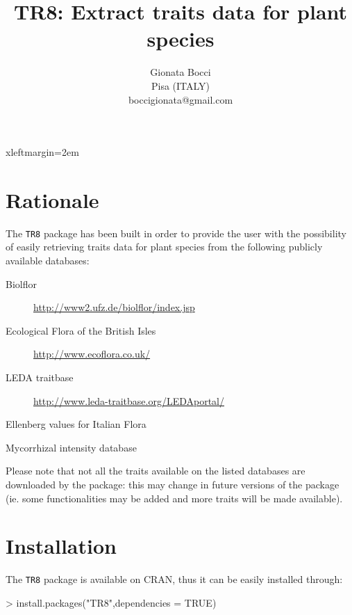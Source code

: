 \documentclass{article}
\title{TR8: Extract traits data for plant species}
\author{Gionata Bocci\\Pisa (ITALY)\\ {boccigionata@gmail.com}}
\begin{document}
\maketitle


 {xleftmargin=2em}
\renewenvironment{Schunk}{\vspace{\topsep}}{\vspace{\topsep}}


\section{Rationale}
\label{sec:rationale}




The \texttt{TR8} package has been built in order to provide the user with the
possibility of easily retrieving traits data for plant species from the following publicly available databases:

\begin{description}
\item[Biolflor] \url{http://www2.ufz.de/biolflor/index.jsp} \cite{biolflor}
\item[Ecological Flora of the British Isles] \url{http://www.ecoflora.co.uk/} \cite{ecoflora}
\item[LEDA traitbase] \url{http://www.leda-traitbase.org/LEDAportal/} \cite{leda}
\item[Ellenberg values for Italian Flora] \cite{pignatti}
\item[Mycorrhizal intensity database] \cite{amf}
\end{description}

  Please note that not all the traits available on the listed
  databases are downloaded by the package: this may change in future
  versions of the package (ie. some functionalities may be added and
  more traits will be made available).

\section{Installation}
\label{sec:installation}
  
  The \texttt{TR8} package is available on CRAN, thus it can be easily installed through:
  
\begin{Schunk}
\begin{Sinput}
> install.packages("TR8",dependencies = TRUE)
\end{Sinput}
\end{Schunk}
\end{document}
